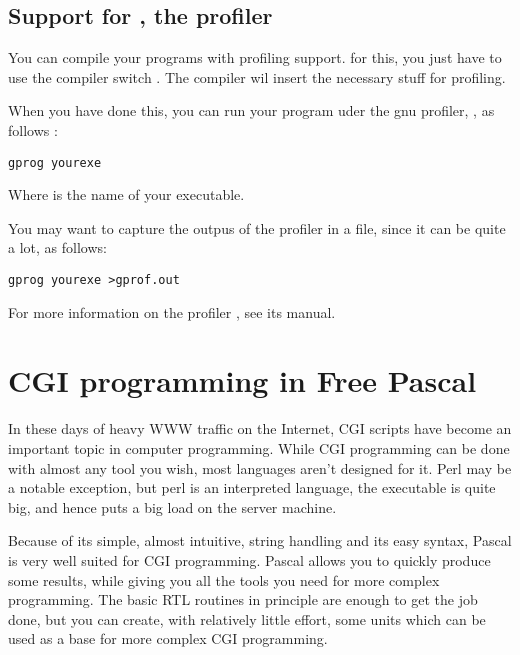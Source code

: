 \documentclass{report}
\begin{document}
\section{Support for , the \gnu profiler}
\label{se:gprof}

You can compile your programs with profiling support. for this, you just
have to use the compiler switch . The compiler wil insert the
necessary stuff for profiling. 

When you have done this, you can run your program uder the gnu profiler,
, as follows :
\begin{verbatim}
gprog yourexe
\end{verbatim}
Where  is the name of your executable.

You may want to capture the outpus of the profiler in a file, since it can
be quite a lot, as follows:
\begin{verbatim}
gprog yourexe >gprof.out
\end{verbatim}

For more information on the \gnu profiler , see its manual.


\chapter{CGI programming in Free Pascal}
\label{ch:CGIProgramming}

In these days of heavy WWW traffic on the Internet, CGI scripts have become
an important topic in computer programming. While CGI programming can be
done with almost any tool you wish, most languages aren't designed for it.
Perl may be a notable exception, but perl is an interpreted language, the
executable is quite big, and hence puts a big load on the server machine.

Because of its simple, almost intuitive, string handling and its easy syntax, 
Pascal is very well suited for CGI programming. Pascal allows you to quickly
produce some results, while giving you all the tools you need for more
complex programming. The basic RTL routines in principle are enough to get
the job done, but you can create, with relatively little effort, some units
which can be used as a base for more complex CGI programming.
\end{document}
